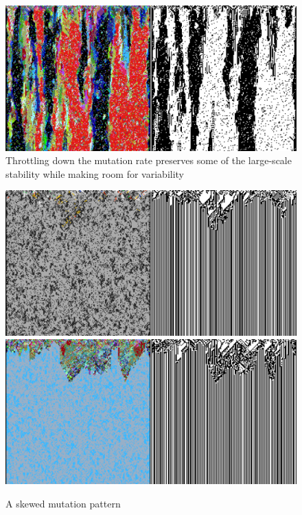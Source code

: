 \documentclass{AISB2008}
\begin{document}
\begin{figure}
\includegraphics[width=\columnwidth]{lamp-down-low.png}
\caption{Throttling down the mutation rate preserves some of the large-scale stability while making room for variability}
\end{figure}

\begin{figure}
\includegraphics[width=\columnwidth]{eoc.png} \newline
\includegraphics[width=\columnwidth]{reef.png}
\caption{A skewed mutation pattern}
\end{figure}
\end{document}
